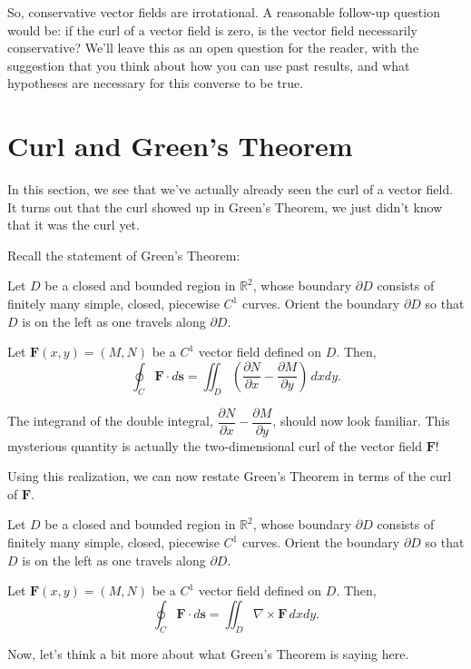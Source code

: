 \documentclass{ximera}
\begin{document}
So, conservative vector fields are irrotational. A reasonable follow-up question would be: if the curl of a vector field is zero, is the vector field necessarily conservative? We'll leave this as an open question for the reader, with the suggestion that you think about how you can use past results, and what hypotheses are necessary for this converse to be true.


\section{Curl and Green's Theorem}

In this section, we see that we've actually already seen the curl of a vector field. It turns out that the curl showed up in Green's Theorem, we just didn't know that it was the curl yet.

Recall the statement of Green's Theorem:

\begin{theorem}
Let $D$ be a closed and bounded region in $\mathbb{R}^2$, whose boundary $\partial D$ consists of finitely many simple, closed, piecewise $C^1$ curves. Orient the boundary $\partial D$ so that $D$ is on the left as one travels along $\partial D$.

Let $\mathbf{F}(x,y)=(M,N)$ be a $C^1$ vector field defined on $D$. Then,
\[
\oint_C\mathbf{F}\cdot d\mathbf{s} = \iint_D\left(\dfrac{\partial N}{\partial x}-\dfrac{\partial M}{\partial y}\right)\,dxdy.
\]
\end{theorem}

The integrand of the double integral, $\dfrac{\partial N}{\partial x}-\dfrac{\partial M}{\partial y}$, should now look familiar. This mysterious quantity is actually the two-dimensional curl of the vector field $\mathbf{F}$!

Using this realization, we can now restate Green's Theorem in terms of the curl of $\mathbf{F}$.

\begin{theorem}
Let $D$ be a closed and bounded region in $\mathbb{R}^2$, whose boundary $\partial D$ consists of finitely many simple, closed, piecewise $C^1$ curves. Orient the boundary $\partial D$ so that $D$ is on the left as one travels along $\partial D$.

Let $\mathbf{F}(x,y)=(M,N)$ be a $C^1$ vector field defined on $D$. Then,
\[
\oint_C\mathbf{F}\cdot d\mathbf{s} = \iint_D\nabla\times\mathbf{F}\,dxdy.
\]
\end{theorem}

Now, let's think a bit more about what Green's Theorem is saying here.
\end{document}
